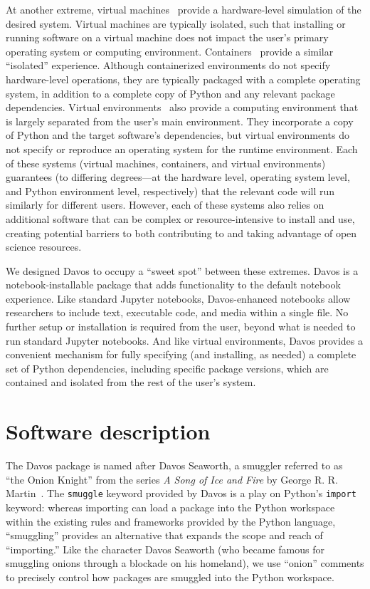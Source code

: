 \documentclass[preprint,12pt,a4paper]{elsarticle}
\begin{document}
At another extreme, virtual machines~\cite{Gold74, AltiEtal05, Rose99}
provide a hardware-level simulation of the desired system.  Virtual
machines are typically isolated, such that installing or running
software on a virtual machine does not impact the user's primary
operating system or computing environment.
Containers~\cite[e.g.,][]{Merk14, KurtEtal17} provide a similar
``isolated'' experience. Although containerized environments do not
specify hardware-level operations, they are typically packaged with a
complete operating system, in addition to a complete copy of Python
and any relevant package dependencies. Virtual
environments~\cite[e.g.,][]{Anac12, Eust19} also provide a computing
environment that is largely separated from the user's main
environment. They incorporate a copy of Python and the target
software's dependencies, but virtual environments do not specify or
reproduce an operating system for the runtime environment. Each of
these systems (virtual machines, containers, and virtual environments)
guarantees (to differing degrees---at the hardware level, operating
system level, and Python environment level, respectively) that the
relevant code will run similarly for different users. However, each of
these systems also relies on additional software that can be complex
or resource-intensive to install and use, creating potential barriers
to both contributing to and taking advantage of open science
resources.

We designed Davos to occupy a ``sweet spot'' between these extremes.
Davos is a notebook-installable package that adds functionality to the
default notebook experience. Like standard Jupyter notebooks,
Davos-enhanced notebooks allow researchers to include text, executable
code, and media within a single file. No further setup or installation is
required from the user, beyond what is needed to run standard Jupyter
notebooks. And like virtual environments, Davos provides a convenient
mechanism for fully specifying (and installing, as needed) a complete set of
Python dependencies, including specific package versions, which are contained
and isolated from the rest of the user's system.


\section{Software description}

The Davos package is named after Davos Seaworth, a smuggler referred
to as ``the Onion Knight'' from the series \textit{A Song of Ice and Fire} by
George R. R. Martin~\cite{Mart98}. The \texttt{smuggle} keyword provided by
Davos is a play on Python's \texttt{import} keyword: whereas importing
can load a package into the Python workspace within the existing rules and
frameworks provided by the Python language, ``smuggling'' provides an
alternative that expands the scope and reach of ``importing.'' Like the
character Davos Seaworth (who became famous for smuggling onions through a
blockade on his homeland), we use ``onion'' comments to precisely control how
packages are smuggled into the Python workspace.
\end{document}
